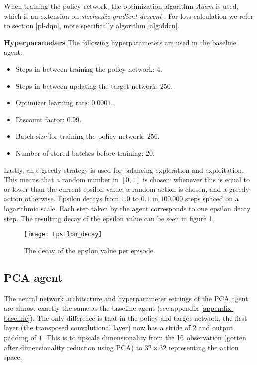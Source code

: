 When training the policy network, the optimization algorithm \emph{Adam} is used, which is an extension on \emph{stochastic gradient descent} \cite{adam}. For loss calculation we refer to section \ref{pl-dqn}, more specifically algorithm \ref{alg:ddqn}.\newline

\noindent\textbf{Hyperparameters}\newline
\noindent The following hyperparameters are used in the baseline agent:
\begin{itemize}
\item Steps in between training the policy network: $4$.
\item Steps in between updating the target network: $250$.
\item Optimizer learning rate: $0.0001$.
\item Discount factor: $0.99$.
\item Batch size for training the policy network: $256$.
\item Number of stored batches before training: $20$.
\end{itemize}

Lastly, an $\epsilon$-greedy strategy is used for balancing exploration and exploitation. This means that a random number in $[0,1]$ is chosen; whenever this is equal to or lower than the current epsilon value, a random action is chosen, and a greedy action otherwise. Epsilon decays from $1.0$ to $0.1$ in $100.000$ steps spaced on a logarithmic scale. Each step taken by the agent corresponds to one epsilon decay step. The resulting decay of the epsilon value can be seen in figure \ref{fig:epsilon}.

\begin{figure}[h]
    \centering
    \texttt{[image: Epsilon\_decay]}
    \caption{The decay of the epsilon value per episode.}
    \label{fig:epsilon}
\end{figure}

\subsection{PCA agent}
The neural network architecture and hyperparameter settings of the PCA agent are almost exactly the same as the baseline agent (see appendix \ref{appendix-baseline}). The only difference is that in the policy and target network, the first layer (the transposed convolutional layer) now has a stride of $2$ and output padding of $1$. This is to upscale dimensionality from the $16 \time 16$ observation (gotten after dimensionality reduction using PCA) to $32 \times 32$ representing the action space.


